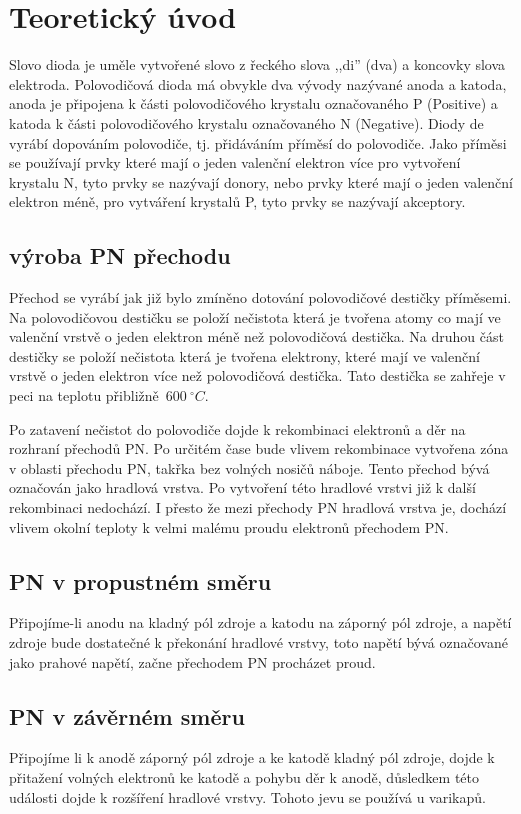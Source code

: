 \section{Teoretický úvod}
  \indent\indent
 Slovo dioda je uměle vytvořené slovo z řeckého slova ,,di'' (dva) a koncovky slova elektroda. Polovodičová dioda má obvykle dva vývody nazývané anoda a katoda, anoda je připojena k části polovodičového krystalu označovaného P (Positive) a katoda k části polovodičového krystalu označovaného N (Negative). Diody de vyrábí dopováním polovodiče, tj. přidáváním příměsí do polovodiče. Jako příměsi se používají prvky které mají o jeden valenční elektron více pro vytvoření krystalu N, tyto prvky se nazývají donory, nebo prvky které mají o jeden valenční elektron méně, pro vytváření krystalů P, tyto prvky se nazývají akceptory.
  
  \subsection{výroba PN přechodu}
  	\indent\indent
  	Přechod se vyrábí jak již bylo zmíněno dotování polovodičové destičky příměsemi. Na polovodičovou destičku se položí nečistota která je tvořena atomy co mají ve valenční vrstvě o jeden elektron méně než polovodičová destička. Na druhou část destičky se položí nečistota která je tvořena elektrony, které mají ve valenční vrstvě o jeden elektron více než polovodičová destička. Tato destička se zahřeje v peci na teplotu přibližně~$600~^\circ C$.
  	
  	Po zatavení nečistot do polovodiče dojde k rekombinaci elektronů a děr na rozhraní přechodů PN. Po určitém čase bude vlivem rekombinace vytvořena zóna v oblasti přechodu PN, takřka bez volných nosičů náboje. Tento přechod bývá označován jako hradlová vrstva. Po vytvoření této hradlové vrstvi již k další rekombinaci nedochází. I přesto že mezi přechody PN hradlová vrstva je, dochází vlivem okolní teploty k velmi malému proudu elektronů přechodem PN. 
  
  \subsection{PN v propustném směru}
  	\indent\indent
  	Připojíme-li anodu na kladný pól zdroje a katodu na záporný pól zdroje, a napětí zdroje bude dostatečné k překonání hradlové vrstvy, toto napětí bývá označované jako prahové napětí, začne přechodem PN procházet proud.
  	
  \subsection{PN v závěrném směru}
  	\indent\indent
  	Připojíme li k anodě záporný pól zdroje a ke katodě kladný pól zdroje, dojde k přitažení volných elektronů ke katodě a pohybu děr k anodě, důsledkem této události dojde k rozšíření hradlové vrstvy. Tohoto jevu se používá u varikapů.

